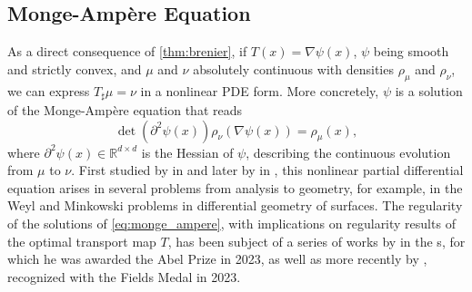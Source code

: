 \subsection{Monge-Amp{\`e}re Equation} \label{sec:background_monge_ampere}


As a direct consequence of \cref{thm:brenier}, if $T(x) = \nabla \psi(x)$, $\psi$ being smooth and strictly convex, and $\mu$ and $\nu$ absolutely continuous with densities $\rho_\mu$ and $\rho_\nu$, we can express $T_\sharp \mu = \nu$ in a nonlinear \acrfull{PDE} form. More concretely, $\psi$ is a solution of the Monge-Amp{\`e}re equation that reads
\begin{equation} \label{eq:monge_ampere}
	\operatorname{det}\left(\partial^2 \psi(x)\right) \rho_\nu(\nabla \psi(x))=\rho_\mu(x),
\end{equation}
where $\partial^2 \psi(x) \in \mathbb{R}^{d \times d}$ is the Hessian of $\psi$, describing the continuous evolution from $\mu$ to $\nu$.
First studied by \citeauthor{monge1781histoire} in \citeyear{monge1781histoire} and later by \citeauthor{ampere1819memoire} in \citeyear{ampere1819memoire}, this nonlinear partial differential equation arises in several problems from analysis to geometry, for example, in the Weyl and Minkowski problems in differential geometry of surfaces. 
The regularity of the solutions of \eqref{eq:monge_ampere}, with implications on regularity results of the optimal transport map $T$, has been subject of a series of works by \citeauthor{caffarelli1990interior} in the \citeyear{caffarelli1990interior}s, for which he was awarded the Abel Prize in 2023, as well as more recently by \citeauthor{figalli2017monge}, recognized with the Fields Medal in 2023.


